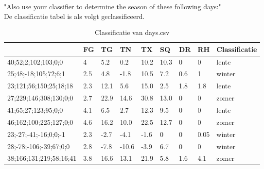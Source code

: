 \documentclass[a4paper]{report}
\begin{document}
"Also use your classifier to determine the season of these following days:" \\
De classificatie tabel is als volgt geclassificeerd.
\begin{table}[h]
  \centering
  \begin{tabular}{|l|l|l|l|l|l|l|l|l|}
  \hline
  & \textbf{FG} & \textbf{TG} & \textbf{TN} & \textbf{TX} & \textbf{SQ} & \textbf{DR} & \textbf{RH} & \textbf{Classificatie} \\
  \hline
  40;52;2;102;103;0;0 & 4 & 5.2 & 0.2 & 10.2 & 10.3 & 0 & 0 & lente\\
  \hline
  25;48;-18;105;72;6;1 & 2.5 & 4.8 & -1.8 & 10.5 & 7.2 & 0.6 & 1 & winter \\
  \hline
  23;121;56;150;25;18;18 & 2.3 & 12.1 & 5.6 & 15.0 & 2.5 & 1.8 & 1.8 & lente\\
  \hline
  27;229;146;308;130;0;0 & 2.7 & 22.9 & 14.6 & 30.8 & 13.0 & 0 & 0 & zomer\\
  \hline
  41;65;27;123;95;0;0 & 4.1 & 6.5 & 2.7 & 12.3 & 9.5 & 0 & 0 & lente\\
  \hline
  46;162;100;225;127;0;0 & 4.6 & 16.2 & 10.0 & 22.5 & 12.7 & 0 & 0 & zomer \\
  \hline
  23;-27;-41;-16;0;0;-1 & 2.3 & -2.7 & -4.1 & -1.6 & 0 & 0 & 0.05 & winter\\
  \hline
  28;-78;-106;-39;67;0;0 & 2.8 & -7.8 & -10.6 & -3.9 & 6.7 & 0 & 0 & winter \\
  \hline
  38;166;131;219;58;16;41 & 3.8 & 16.6 & 13.1 & 21.9 & 5.8 & 1.6 & 4.1 & zomer\\
  \hline
  \end{tabular}
  \caption{Classificatie van days.csv}
  \label{tab:class_days}
  \end{table}
\end{document}
